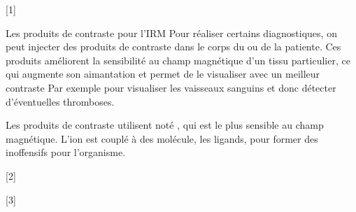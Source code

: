 [1]


\begin{doc}{Les produits de contraste pour l'IRM}
  Pour réaliser certains diagnostiques, on peut injecter des produits de contraste dans le corps du ou de la patiente.
  Ces produits améliorent la sensibilité au champ magnétique d'un tissu particulier, ce qui augmente son aimantation et permet de le visualiser avec un meilleur contraste
  Par exemple pour visualiser les vaisseaux sanguins et donc détecter d'éventuelles thromboses.

  Les produits de contraste utilisent  noté , qui est le plus sensible au champ magnétique.
  L'ion est couplé à des molécule, les ligands, pour former des  inoffensifs pour l'organisme.

\end{doc}


[2]


[3]

